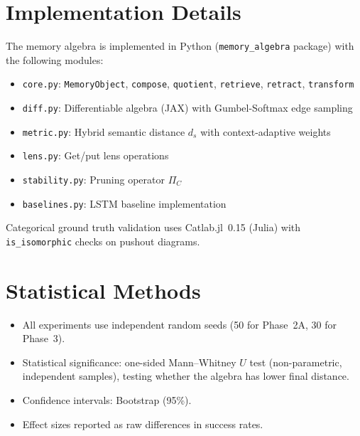 \documentclass[11pt,a4paper]{article}
\theoremstyle{definition}
\begin{document}
\appendix

\section{Implementation Details}

The memory algebra is implemented in Python (\mbox{\texttt{memory\_algebra}} package) with the following modules:

\begin{itemize}
    \item \texttt{core.py}: \texttt{MemoryObject}, \texttt{compose}, \texttt{quotient}, \texttt{retrieve}, \texttt{retract}, \texttt{transform}
    \item \texttt{diff.py}: Differentiable algebra (JAX) with Gumbel-Softmax edge sampling
    \item \texttt{metric.py}: Hybrid semantic distance $d_s$ with context-adaptive weights
    \item \texttt{lens.py}: Get/put lens operations
    \item \texttt{stability.py}: Pruning operator $\Pi_C$
    \item \texttt{baselines.py}: LSTM baseline implementation
\end{itemize}

Categorical ground truth validation uses Catlab.jl~0.15 (Julia) with \texttt{is\_isomorphic} checks on pushout diagrams.

\section{Statistical Methods}

\begin{itemize}
    \item All experiments use independent random seeds (50 for Phase~2A, 30 for Phase~3).
    \item Statistical significance: one-sided Mann--Whitney $U$ test (non-parametric, independent samples), testing whether the algebra has lower final distance.
    \item Confidence intervals: Bootstrap (95\%).
    \item Effect sizes reported as raw differences in success rates.
\end{itemize}
\end{document}

